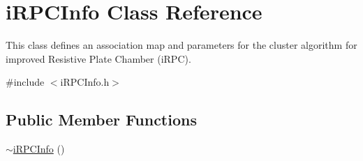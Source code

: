 \hypertarget{classiRPCInfo}{\section{i\-R\-P\-C\-Info Class Reference}
\label{classiRPCInfo}
}


This class defines an association map and parameters for the cluster algorithm for improved Resistive Plate Chamber (i\-R\-P\-C).  




{\ttfamily \#include $<$i\-R\-P\-C\-Info.\-h$>$}

\subsection*{Public Member Functions}
\begin{DoxyCompactItemize}
\item 
\hypertarget{classiRPCInfo_adcbecc0a1faf97e11ca33f622286c5a7}{\hyperlink{classiRPCInfo_adcbecc0a1faf97e11ca33f622286c5a7}{$\sim$i\-R\-P\-C\-Info} ()}\label{classiRPCInfo_adcbecc0a1faf97e11ca33f622286c5a7}


\end{DoxyCompactItemize}
